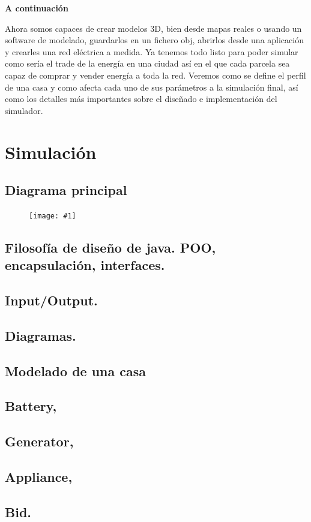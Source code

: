 \documentclass[12pt,a4paper,openright,oneside]{article}
\newcommand{\includeImage}[1]
{
	\begin{figure}[htb]
	\begin{center}
	\texttt{[image: \#1]}
	\end{center}
	\end{figure}
}
\numberwithin{equation}{section}
\theoremstyle{definition}
\begin{document}
\textbf{A continuación}

Ahora somos capaces de crear modelos 3D, bien desde mapas reales o usando un software de modelado, guardarlos en un fichero obj, abrirlos desde una aplicación y crearles una red eléctrica a medida. Ya tenemos todo listo para poder simular como sería el trade de la energía en una ciudad así en el que cada parcela sea capaz de comprar y vender energía a toda la red. Veremos como se define el perfil de una casa y como afecta cada uno de sus parámetros a la simulación final, así como los detalles más importantes sobre el diseñado e implementación del simulador.

\newpage




\section{Simulación}
\subsection{Diagrama principal}
\includeImage{simulator.png}
\subsection{Filosofía de diseño de java. POO, encapsulación, interfaces.}
\subsection{Input/Output. }
\subsection{Diagramas. }
\subsection{Modelado de una casa}
\subsection{Battery, }
\subsection{Generator,} 
\subsection{Appliance, }
\subsection{Bid.}
\end{document}
